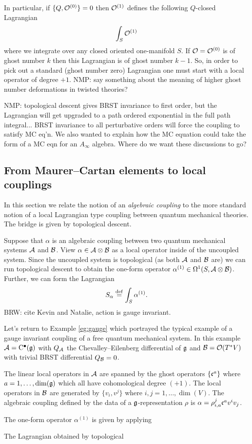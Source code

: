 \documentclass[11pt]{amsart}
\def\brian#1{{\textcolor{blue!65!red}{BRW: {#1}}}}
\def\natalie#1{{\textcolor{green!65!black}{NMP: {#1}}}}
\begin{document}
In particular, if $\{Q,\mathcal O^{(0)}\} = 0$ then $\mathcal O^{(1)}$ defines the following $Q$-closed Lagrangian
\[
\int_S \mathcal O^{(1)} 
\]
where we integrate over any closed oriented one-manifold $S$.
If $\mathcal O = \mathcal O^{(0)}$ is of ghost number $k$ then this Lagrangian is of ghost number $k-1$. 
So, in order to pick out a standard (ghost number zero) Lagrangian one must start with a local operator of degree $+1$. \natalie{say something about the meaning of higher ghost number deformations in twisted theories?}

\natalie{topological descent gives BRST invariance to first order, but the Lagrangian will get upgraded to a path ordered exponential in the full path integral... BRST invariance to all perturbative orders will force the coupling to satisfy MC eq'n. We also wanted to explain how the MC equation could take the form of a MC eqn for an $A_{\infty}$ algebra. Where do we want these discussions to go?}


\subsection{From Maurer--Cartan elements to local couplings} 

In this section we relate the notion of an {\em algebraic coupling} to the more standard notion of a local Lagrangian type coupling between quantum mechanical theories. 
The bridge is given by topological descent. 

Suppose that $\alpha$ is an algebraic coupling between two quantum mechanical systems $\mathcal A$ and $\mathcal B$. 
View $\alpha \in \mathcal A \otimes \mathcal B$ as a local operator inside of the uncoupled system. 
Since the uncoupled system is topological (as both $\mathcal A$ and $\mathcal B$ are) we can run topological descent to obtain the one-form operator $\alpha^{(1)} \in \Omega^1 (S , \mathcal A \otimes \mathcal B)$.
Further, we can form the Lagrangian 
\[
S_\alpha \overset{\rm def}{=} \int_S \alpha^{(1)} .\]
\brian{cite Kevin and Natalie, action is gauge invariant.}

\begin{eg}
\label{eg:gaugelocal}
Let's return to Example \ref{eg:gauge} which portrayed the typical example of a gauge invariant coupling of a free quantum mechanical system. 
In this example $\mathcal A = {\rm C}^\bullet(\mathfrak g)$ with $Q_{\mathcal A}$ the Chevalley--Eilenberg differential of $\mathfrak g$ and $\mathcal B = \mathcal O(T^* V)$ with trivial BRST differential $Q_{\mathcal B} = 0$. 

The linear local operators in $\mathcal A$ are spanned by the ghost operators $\{\mathfrak c^a\}$ where $a = 1,\ldots, \dim(\mathfrak g)$ which all have cohomological degree $(+1)$. 
The local operators in $\mathcal B$ are generated by $\{v_i, v^j\}$ where $i,j=1,\ldots, \dim(V)$. 
The algebraic coupling defined by the data of a $\mathfrak g$-representation $\rho$ is $\alpha = \rho_{i,a}^j \mathfrak c^a v^i v_j$. 

The one-form operator $\alpha^{(1)}$ is given by applying 

The Lagrangian obtained by topological 
\end{eg}
\end{document}
